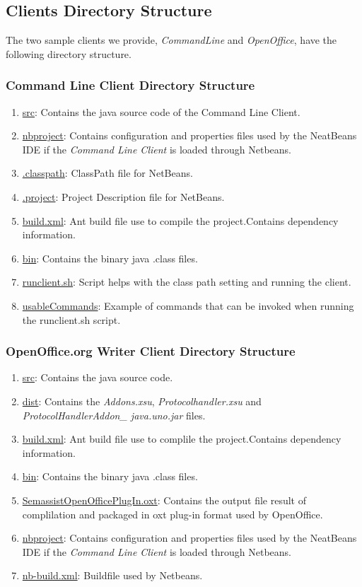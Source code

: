 \subsection{Clients Directory Structure}
The two sample clients we provide, \emph{CommandLine} and \emph{OpenOffice}, have the following directory structure.

\subsubsection{Command Line Client Directory Structure}
\begin{enumerate}
\item \url{src}: Contains the java source code of the Command Line Client.
\item \url{nbproject}: Contains configuration and properties files used by the NeatBeans IDE if the \emph{Command Line Client} is loaded through Netbeans.
\item \url{.classpath}: ClassPath file for NetBeans.
\item \url{.project}: Project Description file for NetBeans.
\item \url{build.xml}: Ant build file use to compile the project.Contains dependency information.
\item \url{bin}: Contains the binary java .class files.
\item \url{runclient.sh}: Script helps with the class path setting and running the client.
\item \url{usableCommands}: Example of commands that can be invoked when running the runclient.sh script.
\end{enumerate}

\subsubsection{OpenOffice.org Writer Client Directory Structure}
\begin{enumerate}
\item \url{src}: Contains the java source code.
\item \url{dist}: Contains the \emph{Addons.xsu}, \emph{Protocolhandler.xsu} and \emph{ProtocolHandlerAddon\_ java.uno.jar} files.
\item \url{build.xml}: Ant build file use to complile the project.Contains dependency information.
\item \url{bin}: Contains the binary java .class files.
\item \url{SemassistOpenOfficePlugIn.oxt}: Contains the output file result of complilation and packaged in oxt plug-in format used by OpenOffice.
\item \url{nbproject}: Contains configuration and properties files used by the NeatBeans IDE if the \emph{Command Line Client} is loaded through Netbeans.
\item \url{nb-build.xml}: Buildfile used by Netbeans.
\end{enumerate}

